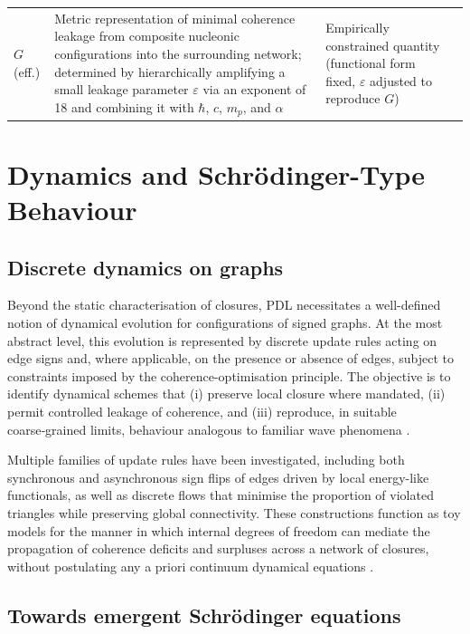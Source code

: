 \documentclass{article}
\begin{document}
\begin{longtable}{@{}p{1.5cm}p{6cm}L{4.5cm}p{2.5cm}@{}}
  $G$ (eff.) &
  Metric representation of minimal coherence leakage from composite nucleonic configurations into the surrounding network; determined by hierarchically amplifying a small leakage parameter $\varepsilon$ via an exponent of 18 and combining it with $\hbar$, $c$, $m_p$, and $\alpha$ &
  Empirically constrained quantity (functional form fixed, $\varepsilon$ adjusted to reproduce $G$) &
  \cite{PDL_Main_2026,Exponent_18_PDL_2026,Coherence_Leakage_18_2026,PDL_position} \\

\end{longtable}

\section{Dynamics and Schr\"odinger-Type Behaviour}
\label{sec:dynamics}

\subsection{Discrete dynamics on graphs}
\label{subsec:discrete_dynamics}

Beyond the static characterisation of closures, PDL necessitates a well-defined notion of dynamical evolution for configurations of signed graphs. At the most abstract level, this evolution is represented by discrete update rules acting on edge signs and, where applicable, on the presence or absence of edges, subject to constraints imposed by the coherence-optimisation principle. The objective is to identify dynamical schemes that (i) preserve local closure where mandated, (ii) permit controlled leakage of coherence, and (iii) reproduce, in suitable coarse‑grained limits, behaviour analogous to familiar wave phenomena \cite{PDL_Main_2026,PDL_position}.

Multiple families of update rules have been investigated, including both synchronous and asynchronous sign flips of edges driven by local energy-like functionals, as well as discrete flows that minimise the proportion of violated triangles while preserving global connectivity. These constructions function as toy models for the manner in which internal degrees of freedom can mediate the propagation of coherence deficits and surpluses across a network of closures, without postulating any a priori continuum dynamical equations \cite{Coherence_Leakage_18_2026}.

\subsection{Towards emergent Schr\"odinger equations}
\label{subsec:emergent_schrodinger}
\end{document}
